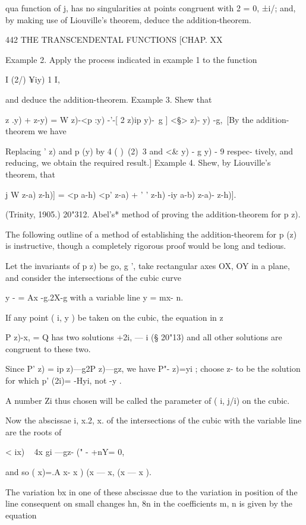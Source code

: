 {qua function of j, has no singularities at points congruent with 2 =
0, ±i/; and, by making use of Liouville's theorem, deduce the
addition-theorem.



442 THE TRANSCENDENTAL FUNCTIONS [CHAP. XX

Example 2. Apply the process indicated in example 1 to the function

I (2/) ¥iy) 1 I,

and deduce the addition-theorem. Example 3. Shew that

  z .y) + z-y) = W z)-<p :y) -'-[ 2 z)ip y)-\ g ] <§> z)- y) -g,\ [By
the addition-theorem we have

Replacing ' z) and p (y) by 4 ( )\ (2)\ 3 and <\& y) - g y) - 9
respec- tively, and reducing, we obtain the required result.] Example
4. Shew, by Liouville's theorem, that

j W z-a) z-h)] = <p a-h) <p' z-a) + ' ' z-h) -iy a-b) z-a)- z-h)].

(Trinity, 1905.) 20"312. Abel's* method of proving the
addition-theorem for p z).

The following outline of a method of establishing the addition-theorem
for p (z) is instructive, though a completely rigorous proof would be
long and tedious.

Let the invariants of p z) be go, g ', take rectangular axes OX, OY in
a plane, and consider the intersections of the cubic curve

y - = Ax -g.2X-g with a variable line y = mx- n.

If any point ( i, y ) be taken on the cubic, the equation in z

P z)-x, = Q has two solutions +2i, — i (§ 20"13) and all other
solutions are congruent to these two.

Since P' z) = ip z)—g2P z)—gz, we have P"- z)=yi ; choose z- to be the
solution for which p' (2i)= -Hyi, not -y .

A number Zi thus chosen will be called the parameter of ( i, j/i) on
the cubic.

Now the abscissae i, x.2, x. of the intersections of the cubic with
the variable line are the roots of

< ix) ~ 4x gi —gz- (" - +nY= 0,

and so ( x)=.A x- x ) (x — x, (x — x ).

The variation bx in one of these abscissae due to the variation in
position of the line consequent on small changes hn, 8n in the
coefficients m, n is given by the equation

}
